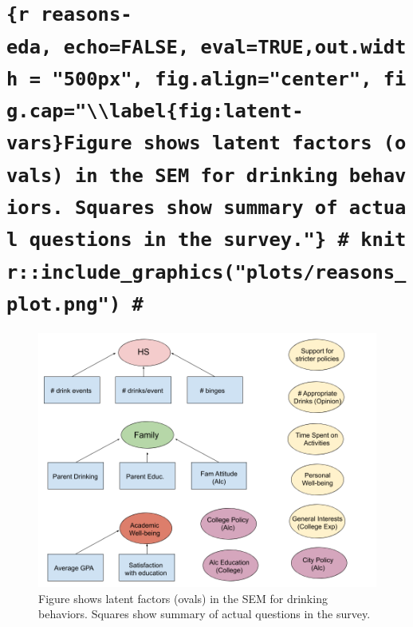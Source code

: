 \documentclass[]{article}
\begin{document}
\hypertarget{r-reasons-eda-echofalse-evaltrueout.width-500px-fig.aligncenter-fig.caplabelfiglatent-varsfigure-shows-latent-factors-ovals-in-the-sem-for-drinking-behaviors.-squares-show-summary-of-actual-questions-in-the-survey.-knitrinclude_graphicsplotsreasons_plot.png}{%
\section{\texorpdfstring{\texttt{\{r\ reasons-eda,\ echo=FALSE,\ eval=TRUE,out.width\ =\ "500px",\ fig.align="center",\ fig.cap="\textbackslash{}\textbackslash{}label\{fig:latent-vars\}Figure\ shows\ latent\ factors\ (ovals)\ in\ the\ SEM\ for\ drinking\ behaviors.\ Squares\ show\ summary\ of\ actual\ questions\ in\ the\ survey."\}\ \#\ knitr::include\_graphics("plots/reasons\_plot.png")\ \#}}{\{r reasons-eda, echo=FALSE, eval=TRUE,out.width = "500px", fig.align="center", fig.cap="\textbackslash{}\textbackslash{}label\{fig:latent-vars\}Figure shows latent factors (ovals) in the SEM for drinking behaviors. Squares show summary of actual questions in the survey."\} \# knitr::include\_graphics("plots/reasons\_plot.png") \#}}\label{r-reasons-eda-echofalse-evaltrueout.width-500px-fig.aligncenter-fig.caplabelfiglatent-varsfigure-shows-latent-factors-ovals-in-the-sem-for-drinking-behaviors.-squares-show-summary-of-actual-questions-in-the-survey.-knitrinclude_graphicsplotsreasons_plot.png}}

\begin{figure}

{\centering \includegraphics[width=500px]{plots/latent_vars} 

}

\caption{\label{fig:latent-vars}Figure shows latent factors (ovals) in the SEM for drinking behaviors. Squares show summary of actual questions in the survey.}\label{fig:latent-vars}
\end{figure}
\end{document}
